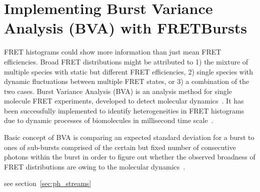 \section{Implementing Burst Variance Analysis (BVA) with FRETBursts}

FRET histograms could show more information than just mean FRET efficiencies. Broad FRET distributions might be attributed to 1) the mixture of multiple species with static but different FRET efficiencies, 2) single species with dynamic fluctuations between multiple FRET states, or 3) a combination of the two cases. Burst Variance Analysis (BVA) is an analysis method for single molecule FRET experiments, developed to detect molecular dynamics~\cite{Torella_2011}. It has been successfully implemented to identify heterogeneities in FRET histograms due to dynamic processes of biomolecules in millisecond time scale~\cite{Torella_2011, Robb_2013}.

Basic concept of BVA is comparing an expected standard deviation for a burst to ones of sub-bursts comprised of the certain but fixed number of consecutive photons within the burst in order to figure out whether the observed broadness of FRET distributions are owing to the molecular dynamics~\cite{Torella_2011}. 

see section~\ref{sec:ph_streams}